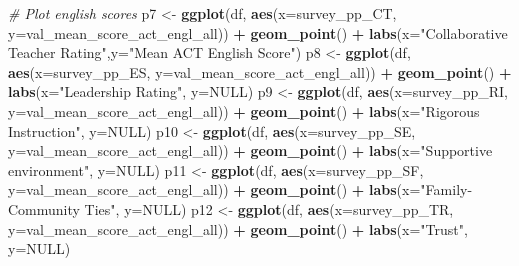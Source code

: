 \documentclass[
  man]{apa6}
\newenvironment{Shaded}{\begin{snugshade}}{\end{snugshade}}
\newcommand{\AttributeTok}[1]{\textcolor[rgb]{0.13,0.29,0.53}{#1}}
\newcommand{\CommentTok}[1]{\textcolor[rgb]{0.56,0.35,0.01}{\textit{#1}}}
\newcommand{\ConstantTok}[1]{\textcolor[rgb]{0.56,0.35,0.01}{#1}}
\newcommand{\FunctionTok}[1]{\textcolor[rgb]{0.13,0.29,0.53}{\textbf{#1}}}
\newcommand{\NormalTok}[1]{#1}
\newcommand{\OtherTok}[1]{\textcolor[rgb]{0.56,0.35,0.01}{#1}}
\newcommand{\SpecialCharTok}[1]{\textcolor[rgb]{0.81,0.36,0.00}{\textbf{#1}}}
\newcommand{\StringTok}[1]{\textcolor[rgb]{0.31,0.60,0.02}{#1}}
\begin{document}
\begin{Shaded}
\begin{Highlighting}[]
\CommentTok{\# Plot english scores}
\NormalTok{p7 }\OtherTok{\textless{}{-}} \FunctionTok{ggplot}\NormalTok{(df, }\FunctionTok{aes}\NormalTok{(}\AttributeTok{x=}\NormalTok{survey\_pp\_CT, }\AttributeTok{y=}\NormalTok{val\_mean\_score\_act\_engl\_all)) }\SpecialCharTok{+} \FunctionTok{geom\_point}\NormalTok{() }\SpecialCharTok{+} \FunctionTok{labs}\NormalTok{(}\AttributeTok{x=}\StringTok{"Collaborative Teacher Rating"}\NormalTok{,}\AttributeTok{y=}\StringTok{"Mean ACT English Score"}\NormalTok{)}
\NormalTok{p8 }\OtherTok{\textless{}{-}} \FunctionTok{ggplot}\NormalTok{(df, }\FunctionTok{aes}\NormalTok{(}\AttributeTok{x=}\NormalTok{survey\_pp\_ES, }\AttributeTok{y=}\NormalTok{val\_mean\_score\_act\_engl\_all)) }\SpecialCharTok{+} \FunctionTok{geom\_point}\NormalTok{() }\SpecialCharTok{+} \FunctionTok{labs}\NormalTok{(}\AttributeTok{x=}\StringTok{"Leadership Rating"}\NormalTok{, }\AttributeTok{y=}\ConstantTok{NULL}\NormalTok{)}
\NormalTok{p9 }\OtherTok{\textless{}{-}} \FunctionTok{ggplot}\NormalTok{(df, }\FunctionTok{aes}\NormalTok{(}\AttributeTok{x=}\NormalTok{survey\_pp\_RI, }\AttributeTok{y=}\NormalTok{val\_mean\_score\_act\_engl\_all)) }\SpecialCharTok{+} \FunctionTok{geom\_point}\NormalTok{() }\SpecialCharTok{+} \FunctionTok{labs}\NormalTok{(}\AttributeTok{x=}\StringTok{"Rigorous Instruction"}\NormalTok{, }\AttributeTok{y=}\ConstantTok{NULL}\NormalTok{)}
\NormalTok{p10 }\OtherTok{\textless{}{-}} \FunctionTok{ggplot}\NormalTok{(df, }\FunctionTok{aes}\NormalTok{(}\AttributeTok{x=}\NormalTok{survey\_pp\_SE, }\AttributeTok{y=}\NormalTok{val\_mean\_score\_act\_engl\_all)) }\SpecialCharTok{+} \FunctionTok{geom\_point}\NormalTok{() }\SpecialCharTok{+} \FunctionTok{labs}\NormalTok{(}\AttributeTok{x=}\StringTok{"Supportive environment"}\NormalTok{, }\AttributeTok{y=}\ConstantTok{NULL}\NormalTok{)}
\NormalTok{p11 }\OtherTok{\textless{}{-}} \FunctionTok{ggplot}\NormalTok{(df, }\FunctionTok{aes}\NormalTok{(}\AttributeTok{x=}\NormalTok{survey\_pp\_SF, }\AttributeTok{y=}\NormalTok{val\_mean\_score\_act\_engl\_all)) }\SpecialCharTok{+} \FunctionTok{geom\_point}\NormalTok{() }\SpecialCharTok{+} \FunctionTok{labs}\NormalTok{(}\AttributeTok{x=}\StringTok{"Family{-}Community Ties"}\NormalTok{, }\AttributeTok{y=}\ConstantTok{NULL}\NormalTok{)}
\NormalTok{p12 }\OtherTok{\textless{}{-}} \FunctionTok{ggplot}\NormalTok{(df, }\FunctionTok{aes}\NormalTok{(}\AttributeTok{x=}\NormalTok{survey\_pp\_TR, }\AttributeTok{y=}\NormalTok{val\_mean\_score\_act\_engl\_all)) }\SpecialCharTok{+} \FunctionTok{geom\_point}\NormalTok{() }\SpecialCharTok{+} \FunctionTok{labs}\NormalTok{(}\AttributeTok{x=}\StringTok{"Trust"}\NormalTok{, }\AttributeTok{y=}\ConstantTok{NULL}\NormalTok{)}


\end{Highlighting}
\end{Shaded}
\end{document}
